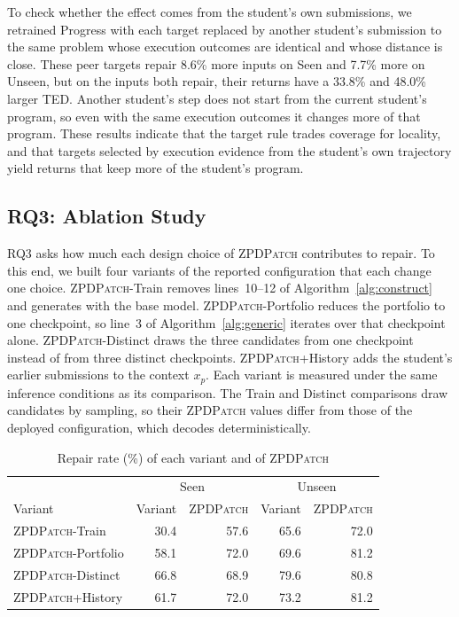 \documentclass[10pt,conference]{IEEEtran}
\begin{document}
To check whether the effect comes from the student's own submissions, we retrained Progress with each target replaced by another student's submission to the same problem whose execution outcomes are identical and whose distance is close. These peer targets repair 8.6\% more inputs on Seen and 7.7\% more on Unseen, but on the inputs both repair, their returns have a 33.8\% and 48.0\% larger TED. Another student's step does not start from the current student's program, so even with the same execution outcomes it changes more of that program. These results indicate that the target rule trades coverage for locality, and that targets selected by execution evidence from the student's own trajectory yield returns that keep more of the student's program.

\subsection{RQ3: Ablation Study}
\label{sec:rq-ablation}

RQ3 asks how much each design choice of \textsc{ZPDPatch} contributes to repair. To this end, we built four variants of the reported configuration that each change one choice. \textsc{ZPDPatch}-Train removes lines~10--12 of Algorithm~\ref{alg:construct} and generates with the base model. \textsc{ZPDPatch}-Portfolio reduces the portfolio to one checkpoint, so line~3 of Algorithm~\ref{alg:generic} iterates over that checkpoint alone. \textsc{ZPDPatch}-Distinct draws the three candidates from one checkpoint instead of from three distinct checkpoints. \textsc{ZPDPatch}+History adds the student's earlier submissions to the context \(x_p\). Each variant is measured under the same inference conditions as its comparison. The Train and Distinct comparisons draw candidates by sampling, so their \textsc{ZPDPatch} values differ from those of the deployed configuration, which decodes deterministically.

\begin{table}[h]
\caption{Repair rate (\%) of each variant and of \textsc{ZPDPatch}}
\label{tab:ablation}
\centering\scriptsize
\begin{tabular}{l||rr|rr}
\toprule
 & \multicolumn{2}{c|}{Seen} & \multicolumn{2}{c}{Unseen} \\
Variant & Variant & \textsc{ZPDPatch} & Variant & \textsc{ZPDPatch} \\
\midrule
\textsc{ZPDPatch}-Train & 30.4 & 57.6 & 65.6 & 72.0 \\
\textsc{ZPDPatch}-Portfolio & 58.1 & 72.0 & 69.6 & 81.2 \\
\textsc{ZPDPatch}-Distinct & 66.8 & 68.9 & 79.6 & 80.8 \\
\textsc{ZPDPatch}+History & 61.7 & 72.0 & 73.2 & 81.2 \\
\bottomrule
\end{tabular}
\end{table}
\end{document}
